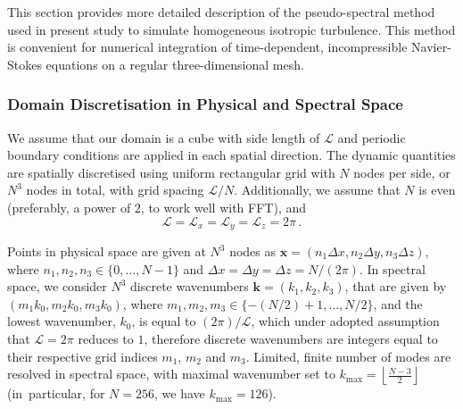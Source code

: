 \documentclass{pracamgren}
\begin{document}
This section provides more detailed description of the pseudo-spectral method used in present study to simulate homogeneous isotropic turbulence. This method is convenient for numerical integration of time-dependent, incompressible Navier-Stokes equations on a regular three-dimensional mesh.
 


\subsubsection{Domain Discretisation in Physical and Spectral Space}

We assume that our domain is a cube with side length of $\mathcal{L}$ and periodic boundary conditions are applied in each spatial direction.
The dynamic quantities are spatially discretised using uniform rectangular grid with $N$ nodes per side, or $N^3$ nodes in total, with grid spacing $\mathcal{L} / N$.
Additionally, we assume that $N$ is even (preferably, a power of $2$, to work well with FFT), and 
$$ \mathcal{L} = \mathcal{L}_x = \mathcal{L}_y = \mathcal{L}_z = 2 \pi \, .$$

Points in physical space are given at $N^{3}$ nodes as $\mathbf{x} = (n_1 \Delta x, n_2 \Delta y, n_3 \Delta z)$, where $n_1, n_2, n_3 \in \{ 0, \ldots, N - 1 \}$ and $\Delta x = \Delta y = \Delta z = N / (2 \pi)$.
In spectral space, we consider $N^3$ discrete wavenumbers $\mathbf{k} = (k_1, k_2, k_3)$, that are given by $(m_1 k_0, m_2 k_0, m_3 k_0)$, where $m_1, m_2, m_3 \in \{ -(N / 2) + 1 , \ldots, N / 2 \}$, and the lowest wavenumber, $k_0$, is equal to $(2 \pi) / \mathcal{L}$, which under adopted assumption that $\mathcal{L} = 2 \pi$ reduces to $1$, therefore discrete wavenumbers are integers equal to their respective grid indices $m_1$, $m_2$ and $m_3$.
Limited, finite number of modes are resolved in spectral space, with maximal wavenumber set to $k_{\max} = \left\lfloor \frac{N - 3}{2} \right\rfloor$ (in~particular, for $N=256$, we have $k_{\max} = 126$).
\end{document}
